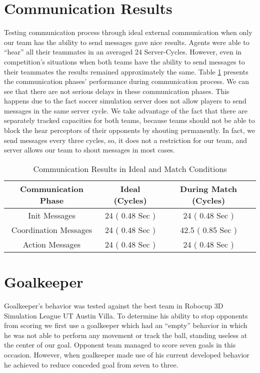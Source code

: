 \section{Communication Results}
Testing communication process through ideal external communication when only our team has the ability to send messages gave nice results. Agents were able to ``hear'' all their teammates in an averaged 24 Server-Cycles. However, even in competition's situations when both teams have the ability to send messages to their teammates the results remained approximately the same. Table \ref{CommunicationResults} presents the communication phases' performance during communication process. We can see that there are not serious delays in these communication phases. This happens due to the fact soccer simulation server does not allow players to send messages in the same server cycle. We take advantage of the fact that there are separately tracked capacities for both teams, because teams should not be able to block the hear perceptors of their opponents by shouting permanently. In fact, we send  messages every three cycles, so, it does not a restriction for our team, and server allows our team to shout messages in most cases.

\begin{table}
\begin{center}
    \begin{tabular}{ccc}
    \textbf{Communication Phase} 	& \textbf{Ideal} (Cycles) 			& \textbf{During Match} (Cycles) \\
    \midrule
    Init Messages 					& 24  ( 0.48 Sec ) 			& 24 	( 0.48 Sec )		\\
    Coordination Messages			& 24  ( 0.48 Sec )			& 42.5  ( 0.85 Sec )		\\
    Action Messages 				    & 24  ( 0.48 Sec )			& 24 ( 0.48 Sec )	 		\\
    \end{tabular}
\end{center}
\label{CommunicationResults}
\caption{Communication Results in Ideal and Match Conditions}
\end{table}



\section{Goalkeeper}
Goalkeeper's behavior was tested against the best team in Robocup 3D Simulation League UT Austin Villa. To determine his ability to stop opponents from scoring we first use a goalkeeper which had an ``empty'' behavior in which he was not able to perform any movement or track the ball, standing useless at the center of our goal. Opponent team managed to score seven goals in this occasion. However, when goalkeeper made use of his current developed behavior he achieved to reduce conceded goal from seven to three. 







